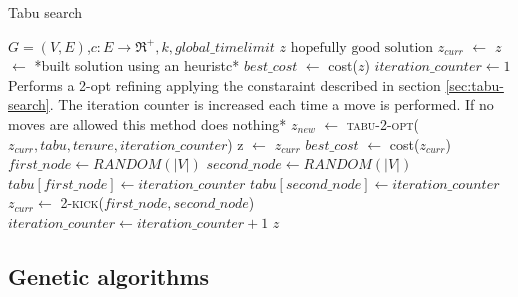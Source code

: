 \begin{algorithm}
	\caption{Tabu search}\label{algo:tabu-search}
	\begin{algorithmic}[1]
		\Require $G=(V,E)$,$ c:E\rightarrow \Re^+, k, global\_timelimit$
		\Ensure $z\text{ hopefully good solution}$
		\State $z_{curr}$ $\gets$ $z$ $\gets$ *built solution using an heuristc*
		\State $best\_cost$ $\gets$ cost($z$)
		\State $iteration\_counter \gets 1$
			\State *Performs a 2-opt refining applying the constaraint described in section \ref{sec:tabu-search}. The iteration counter is increased each time a move is performed. If no moves are allowed this method does nothing*
			\State $z_{new}$ $\gets$ \textsc{tabu-2-opt($z_{curr}, tabu, tenure, iteration\_counter$)}
				\State z $\gets$ $z_{curr}$
				\State $best\_cost$ $\gets$ cost($z_{curr}$)
			\EndIf
			\State $first\_node \gets RANDOM(|V|)$
			\State $second\_node \gets RANDOM(|V|)$
			\State $tabu[first\_node] \gets iteration\_counter$
			\State $tabu[second\_node] \gets iteration\_counter$
			\State $z_{curr} \gets $ \textsc{2-kick($first\_node, second\_node$)}
			\State $iteration\_counter \gets iteration\_counter+1$
		\EndWhile
		\State \Return $z$
	\end{algorithmic}
\end{algorithm}

\subsection{Genetic algorithms}